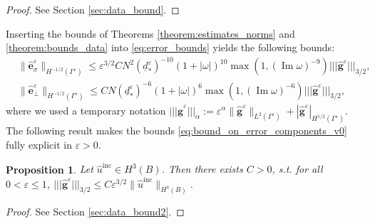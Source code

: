\documentclass[]{article}
\newtheorem{proposition}{Proposition}
\numberwithin{equation}{section}
\numberwithin{theorem}{section}
\numberwithin{lemma}{section}
\numberwithin{corollary}{section}
\numberwithin{proposition}{section}
\numberwithin{definition}{section}
\newcommand{\re}{\varepsilon}
\renewcommand{\vec}{\boldsymbol}
\renewcommand{\Im}{\operatorname{Im}}
\newcommand{\inc}{\operatorname{inc}}
\newcommand{\trinorm}[1]{\vert\!\vert\!\vert #1 \vert\!\vert\!\vert}
\begin{document}
	\begin{proof}
		See Section \ref{sec:data_bound}.
	\end{proof}
	Inserting the bounds of Theorems \ref{theorem:estimates_norms} and \ref{theorem:bounds_data} into \eqref{eq:error_bounds} yields the following bounds:
	\begin{equation}
		\label{eq:bound_on_error_components_v0}
		\begin{aligned}
			&\| \hat{\vec{e}}^{\re}_{\sigma} \|_{H^{-1/2}(\Gamma^{\re})} \leq \re^{3/2} C N^2 (\underline{d}^{\re}_{*})^{-10} (1+|\omega|)^{10} \max(1, (\Im \omega)^{-9}) \trinorm{\hat{\vec{g}}^{\re}}_{3/2},\\
			&\| \hat{\vec{e}}^{\re}_{\perp} \|_{H^{-1/2}(\Gamma^{\re})} \leq C N (\underline{d}^{\re}_{*})^{-6} (1+|\omega|)^6 \max(1, (\Im \omega)^{-6})\trinorm{\hat{\vec{g}}^{\re}}_{3/2},
		\end{aligned}
	\end{equation}
	where we used a temporary notation $\trinorm{\hat{\vec{g}}^{\re}}_{\alpha}:=\re^{\alpha} \|  \hat{\vec{g}}^{\re} \|_{L^2(\Gamma^{\re})} +  |  \hat{\vec{g}}^{\re} |_{H^{1/2}(\Gamma^{\re})}$. The following result makes the bounds \eqref{eq:bound_on_error_components_v0} fully explicit in  $\re>0$.
	\begin{proposition}
		\label{prop:data}
		Let $\hat{u}^{\inc}\in H^3(B)$. Then there exists $C>0$, s.t. for all $0<\re\leq 1$,  $\trinorm{\hat{\vec{g}}^{\re}}_{3/2}\leq C \re^{3/2}\|\hat{u}^{\inc}\|_{H^3(B)}$. 
	\end{proposition}
	\begin{proof}
		See Section \ref{sec:data_bound2}.
	\end{proof}
\end{document}
